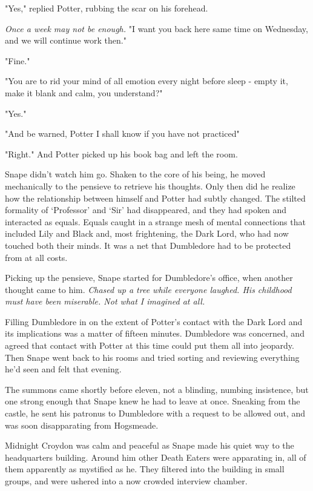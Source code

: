 "Yes," replied Potter, rubbing the scar on his forehead.

\emph{Once a week may not be enough.} "I want you back here same time on Wednesday, and we will continue work then."

"Fine."

"You are to rid your mind of all emotion every night before sleep - empty it, make it blank and calm, you understand?"

"Yes."

"And be warned, Potter{\el} I shall know if you have not practiced{\el}"

"Right." And Potter picked up his book bag and left the room.

Snape didn't watch him go. Shaken to the core of his being, he moved mechanically to the pensieve to retrieve his thoughts. Only then did he realize how the relationship between himself and Potter had subtly changed. The stilted formality of `Professor' and `Sir' had disappeared, and they had spoken and interacted as equals. Equals caught in a strange mesh of mental connections that included Lily and Black and, most frightening, the Dark Lord, who had now touched both their minds. It was a net that Dumbledore had to be protected from at all costs.

Picking up the pensieve, Snape started for Dumbledore's office, when another thought came to him. \emph{Chased up a tree while everyone laughed. His childhood must have been miserable. Not what I imagined at all.}

Filling Dumbledore in on the extent of Potter's contact with the Dark Lord and its implications was a matter of fifteen minutes. Dumbledore was concerned, and agreed that contact with Potter at this time could put them all into jeopardy. Then Snape went back to his rooms and tried sorting and reviewing everything he'd seen and felt that evening.

The summons came shortly before eleven, not a blinding, numbing insistence, but one strong enough that Snape knew he had to leave at once. Sneaking from the castle, he sent his patronus to Dumbledore with a request to be allowed out, and was soon disapparating from Hogsmeade.

Midnight Croydon was calm and peaceful as Snape made his quiet way to the headquarters building. Around him other Death Eaters were apparating in, all of them apparently as mystified as he. They filtered into the building in small groups, and were ushered into a now crowded interview chamber.

